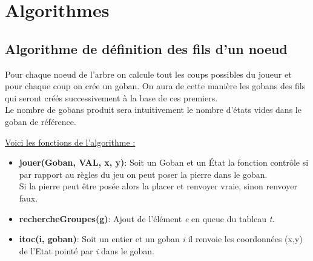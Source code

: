            
    \section{Algorithmes}
        \subsection{Algorithme de définition des fils d'un noeud}
            Pour chaque noeud de l'arbre on calcule tout les coups possibles du joueur et pour chaque coup on crée un goban. On aura de cette manière les gobans des fils qui seront créés successivement à la base de ces premiers.\\
            Le nombre de gobans produit sera intuitivement le nombre d'états vides dans le goban de référence.
            
            \begin{framed}
                \underline{Voici les fonctions de l'algorithme :}
                \begin{itemize}
                    \item \textbf{jouer(Goban, VAL, x, y)}:
                    Soit un Goban et un État la fonction
                    contrôle si par rapport au règles du jeu on peut poser la pierre dans le goban.\\
                    Si la pierre peut être posée alors la placer et renvoyer vraie, sinon renvoyer faux.
                    
                    \item \textbf{rechercheGroupes(g)}:
                    Ajout de l'élément \textit{e} en queue du tableau \textit{t}.
                    
                    \item \textbf{itoc(i, goban)}:
                    Soit un entier et un goban \textit{i} il renvoie les coordonnées (x,y) de l'Etat pointé par \textit{i} dans le goban.
                \end{itemize}
            \end{framed}
            
